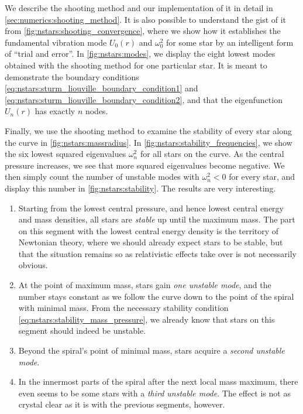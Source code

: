 We describe the shooting method and our implementation of it in detail in \cref{sec:numerics:shooting_method}.
It is also possible to understand the gist of it from \cref{fig:nstars:shooting_convergence}, where we show how it establishes the fundamental vibration mode $U_0(r)$ and $\omega_0^2$ for some star by an intelligent form of ``trial and error''.
In \cref{fig:nstars:modes}, we display the eight lowest modes obtained with the shooting method for one particular star.
It is meant to demonstrate the boundary conditions \eqref{eq:nstars:sturm_liouville_boundary_condition1} and \eqref{eq:nstars:sturm_liouville_boundary_condition2}, and that the eigenfunction $U_n(r)$ has exactly $n$ nodes.

Finally, we use the shooting method to examine the stability of every star along the curve in \cref{fig:nstars:massradius}.
In \cref{fig:nstars:stability_frequencies}, we show the six lowest squared eigenvalues $\omega_n^2$ for all stars on the curve.
As the central pressure increases, we see that more squared eigenvalues become negative.
We then simply count the number of unstable modes with $\omega_n^2 < 0$ for every star, and display this number in \cref{fig:nstars:stability}.
The results are very interesting.
\begin{enumerate}
\item Starting from the lowest central pressure, and hence lowest central energy and mass densities, all stars are \emph{stable} up until the maximum mass.
      The part on this segment with the lowest central energy density is the territory of Newtonian theory, where we should already expect stars to be stable, but that the situation remains so as relativistic effects take over is not necessarily obvious.
\item At the point of maximum mass, stars gain \emph{one unstable mode}, and the number stays constant as we follow the curve down to the point of the spiral with minimal mass.
      From the necessary stability condition \eqref{eq:nstars:stability_mass_pressure}, we already know that stars on this segment should indeed be unstable.
\item Beyond the spiral's point of minimal mass, stars acquire a \emph{second unstable mode}.
\item In the innermost parts of the spiral after the next local mass maximum, there even seems to be some stars with a \emph{third unstable mode}.
      The effect is not as crystal clear as it is with the previous segments, however.
\end{enumerate}

